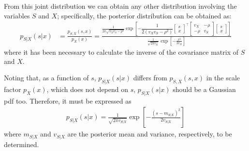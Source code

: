 From this joint distribution we can obtain any other distribution involving the variables $S$ and $X$; specifically, the posterior distribution can be obtained as:
\begin{align}
\label{Est_psxgauss}
p_{S|X}(s|x) 
	&= \frac{p_{S,X}(s,x)}{p_X(x)} 
	 = \frac{\frac{1}{2\pi \sqrt{v_X v_S - \rho^2}}
	         \exp\left[-\dfrac{1}{2(v_X v_S - \rho^2)} 
	         			\begin{bmatrix} s \\ x \end{bmatrix}^\intercal
	                    \begin{bmatrix} v_X & -\rho \\ -\rho & v_S \end{bmatrix} 
	                    \begin{bmatrix} s \\ x \end{bmatrix}\right]}
	        {\frac{1}{\sqrt{2\pi v_X}} \exp\left[-\frac{x^2}{2 v_X}\right]}
\end{align}
where it has been necessary to calculate the inverse of the covariance matrix of $S$ and $X$. 

{Noting that, as a function of $s$, $p_{S|X}(s|x)$ differs from $p_{S,X}(s,x)$ in the scale factor $p_X(x)$, which does not depend on $s$,  $p_{S|X}(s|x)$ should be a Gaussian pdf too. Therefore, it must be expressed as
\begin{align}
\label{Est_postsxgauss}
p_{S|X}(s|x) = \frac{1}{\sqrt{2\pi v_{S|X}}} \exp\left[ -\frac{(s - m_{S|X})^2}{2 v_{S|X}}\right] 
\end{align}
where $m_{S|X}$ and $v_{S|X}$ are the posterior mean and variance, respectively, to be determined.}

